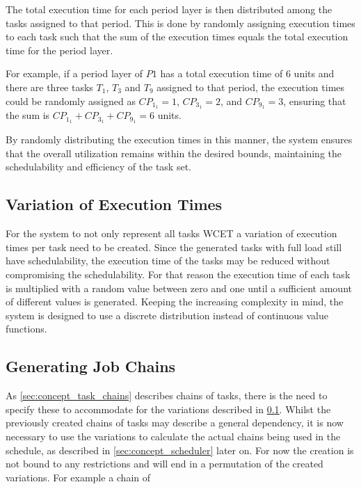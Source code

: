 The total execution time for each period layer is then distributed among the tasks assigned to that period. This is done by randomly assigning execution times to each task such that the sum of the execution times equals the total execution time for the period layer.

For example, if a period layer of $P1$ has a total execution time of $6$ units and there are three tasks $T_1$, $T_3$ and $T_9$ assigned to that period, the execution times could be randomly assigned as $CP_{1_1} = 1$, $CP_{3_1} = 2$, and $CP_{9_1} = 3$, ensuring that the sum is \( CP_{1_1} + CP_{3_1} + CP_{9_1} = 6 \) units.

By randomly distributing the execution times in this manner, the system ensures that the overall utilization remains within the desired bounds, maintaining the schedulability and efficiency of the task set.


\subsection{Variation of Execution Times}\label{sec:concept_lower_execution_times}
For the system to not only represent all tasks \ac{WCET} a variation of execution times per task need to be created.
Since the generated tasks with full load still have schedulability, the execution time of the tasks may be reduced without compromising the schedulability.
For that reason the execution time of each task is multiplied with a random value between zero and one until a sufficient amount of different values is generated.
Keeping the increasing complexity in mind, the system is designed to use a discrete distribution instead of continuous value functions. 

\subsection{Generating Job Chains}\label{sec:concept_job_chains}
As \cref{sec:concept_task_chains} describes chains of tasks, there is the need to specify these to accommodate for the variations described in \cref{sec:concept_lower_execution_times}.
Whilst the previously created chains of tasks may describe a general dependency, it is now necessary to use the variations to calculate the actual chains being used in the schedule, as described in \cref{sec:concept_scheduler} later on.
For now the creation is not bound to any restrictions and will end in a permutation of the created variations.
For example a chain of 

